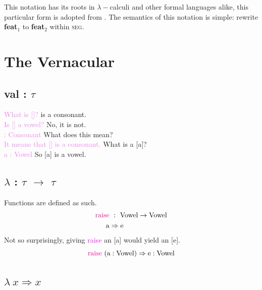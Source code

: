 \documentclass{report}[12pt]
\begin{document}
This notation has its roots in $\lambda-$calculi and other formal languages alike, this particular form is adopted from \cite{tpl}. The semantics of this notation is simple: rewrite \textbf{feat}$_1$ to \textbf{feat}$_2$ within \textsc{seg}.

\section{The Vernacular}

\subsection*{val : $\tau$}

\begin{tcolorbox}
  \textcolor{violet}{What is []?} \quad [\textipa{S}] is a consonant. \\
  \textcolor{violet}{Is [] a vowel?} \quad No, it is not. \\
  \textcolor{violet}{ : Consonant} \quad What does this mean? \\
  \textcolor{violet}{It means that [] is a consonant.} \quad What is a [a]? \\
  \textcolor{violet}{a : Vowel} \quad So [a] is a vowel. \\
\end{tcolorbox}

\subsection*{$\lambda$ : $\tau$ $\rightarrow$ $\tau$}

Functions are defined as such.
\begin{align*}
\text{\textcolor{magenta}{raise}} &\ :\ \text{Vowel} \rightarrow \text{Vowel} \\
\text{a} & \Rightarrow \text{e} \\
\end{align*}
Not so surprisingly, giving \textcolor{magenta}{raise} an [a] would yield an [e].
\[ \text{\textcolor{magenta}{raise}}\ (\text{a} : \text{Vowel}) \Rightarrow \text{e} : \text{Vowel} \]

\subsection*{$\lambda\ x \Rightarrow x$}
\end{document}
